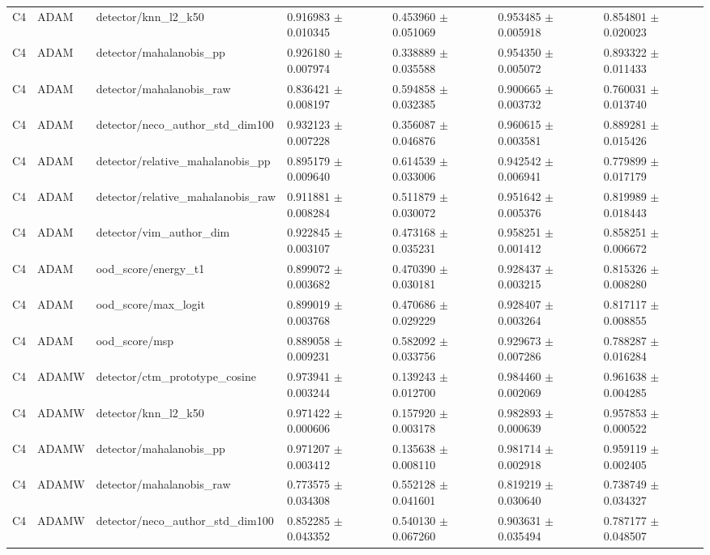 \begin{longtable}{lllllll}
C4 & ADAM & detector/knn\_l2\_k50 & 0.916983 $\pm$ 0.010345 & 0.453960 $\pm$ 0.051069 & 0.953485 $\pm$ 0.005918 & 0.854801 $\pm$ 0.020023 \\
C4 & ADAM & detector/mahalanobis\_pp & 0.926180 $\pm$ 0.007974 & 0.338889 $\pm$ 0.035588 & 0.954350 $\pm$ 0.005072 & 0.893322 $\pm$ 0.011433 \\
C4 & ADAM & detector/mahalanobis\_raw & 0.836421 $\pm$ 0.008197 & 0.594858 $\pm$ 0.032385 & 0.900665 $\pm$ 0.003732 & 0.760031 $\pm$ 0.013740 \\
C4 & ADAM & detector/neco\_author\_std\_dim100 & 0.932123 $\pm$ 0.007228 & 0.356087 $\pm$ 0.046876 & 0.960615 $\pm$ 0.003581 & 0.889281 $\pm$ 0.015426 \\
C4 & ADAM & detector/relative\_mahalanobis\_pp & 0.895179 $\pm$ 0.009640 & 0.614539 $\pm$ 0.033006 & 0.942542 $\pm$ 0.006941 & 0.779899 $\pm$ 0.017179 \\
C4 & ADAM & detector/relative\_mahalanobis\_raw & 0.911881 $\pm$ 0.008284 & 0.511879 $\pm$ 0.030072 & 0.951642 $\pm$ 0.005376 & 0.819989 $\pm$ 0.018443 \\
C4 & ADAM & detector/vim\_author\_dim & 0.922845 $\pm$ 0.003107 & 0.473168 $\pm$ 0.035231 & 0.958251 $\pm$ 0.001412 & 0.858251 $\pm$ 0.006672 \\
C4 & ADAM & ood\_score/energy\_t1 & 0.899072 $\pm$ 0.003682 & 0.470390 $\pm$ 0.030181 & 0.928437 $\pm$ 0.003215 & 0.815326 $\pm$ 0.008280 \\
C4 & ADAM & ood\_score/max\_logit & 0.899019 $\pm$ 0.003768 & 0.470686 $\pm$ 0.029229 & 0.928407 $\pm$ 0.003264 & 0.817117 $\pm$ 0.008855 \\
C4 & ADAM & ood\_score/msp & 0.889058 $\pm$ 0.009231 & 0.582092 $\pm$ 0.033756 & 0.929673 $\pm$ 0.007286 & 0.788287 $\pm$ 0.016284 \\
C4 & ADAMW & detector/ctm\_prototype\_cosine & 0.973941 $\pm$ 0.003244 & 0.139243 $\pm$ 0.012700 & 0.984460 $\pm$ 0.002069 & 0.961638 $\pm$ 0.004285 \\
C4 & ADAMW & detector/knn\_l2\_k50 & 0.971422 $\pm$ 0.000606 & 0.157920 $\pm$ 0.003178 & 0.982893 $\pm$ 0.000639 & 0.957853 $\pm$ 0.000522 \\
C4 & ADAMW & detector/mahalanobis\_pp & 0.971207 $\pm$ 0.003412 & 0.135638 $\pm$ 0.008110 & 0.981714 $\pm$ 0.002918 & 0.959119 $\pm$ 0.002405 \\
C4 & ADAMW & detector/mahalanobis\_raw & 0.773575 $\pm$ 0.034308 & 0.552128 $\pm$ 0.041601 & 0.819219 $\pm$ 0.030640 & 0.738749 $\pm$ 0.034327 \\
C4 & ADAMW & detector/neco\_author\_std\_dim100 & 0.852285 $\pm$ 0.043352 & 0.540130 $\pm$ 0.067260 & 0.903631 $\pm$ 0.035494 & 0.787177 $\pm$ 0.048507 \\

\end{longtable}
